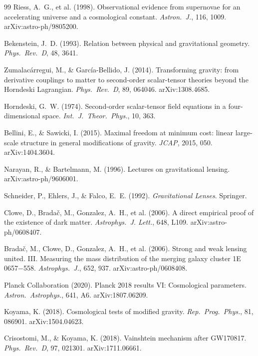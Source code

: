 \documentclass[12pt,a4paper]{article}
\begin{document}
\begin{thebibliography}{99}
  Riess, A.~G., et al. (1998).
  Observational evidence from supernovae for an accelerating universe and a
  cosmological constant.
  \textit{Astron.\ J.}, 116, 1009.
  arXiv:astro-ph/9805200.

  Bekenstein, J.~D. (1993).
  Relation between physical and gravitational geometry.
  \textit{Phys.\ Rev.\ D}, 48, 3641.

  Zumalacárregui, M., \& García-Bellido, J. (2014).
  Transforming gravity: from derivative couplings to matter to second-order
  scalar-tensor theories beyond the Horndeski Lagrangian.
  \textit{Phys.\ Rev.\ D}, 89, 064046.
  arXiv:1308.4685.

  Horndeski, G.~W. (1974).
  Second-order scalar-tensor field equations in a four-dimensional space.
  \textit{Int.\ J.\ Theor.\ Phys.}, 10, 363.

  Bellini, E., \& Sawicki, I. (2015).
  Maximal freedom at minimum cost: linear large-scale structure in general
  modifications of gravity.
  \textit{JCAP}, 2015, 050.
  arXiv:1404.3604.

  Narayan, R., \& Bartelmann, M. (1996).
  Lectures on gravitational lensing.
  arXiv:astro-ph/9606001.

  Schneider, P., Ehlers, J., \& Falco, E.~E. (1992).
  \textit{Gravitational Lenses}.
  Springer.

  Clowe, D., Bradač, M., Gonzalez, A.~H., et al. (2006).
  A direct empirical proof of the existence of dark matter.
  \textit{Astrophys.\ J. Lett.}, 648, L109.
  arXiv:astro-ph/0608407.

  Bradač, M., Clowe, D., Gonzalez, A.~H., et al. (2006).
  Strong and weak lensing united. III. Measuring the mass distribution of
  the merging galaxy cluster 1E 0657$-$558.
  \textit{Astrophys.\ J.}, 652, 937.
  arXiv:astro-ph/0608408.

  Planck Collaboration (2020).
  Planck 2018 results VI: Cosmological parameters.
  \textit{Astron.\ Astrophys.}, 641, A6.
  arXiv:1807.06209.

  Koyama, K. (2018).
  Cosmological tests of modified gravity.
  \textit{Rep.\ Prog.\ Phys.}, 81, 086901.
  arXiv:1504.04623.

  Crisostomi, M., \& Koyama, K. (2018).
  Vainshtein mechanism after GW170817.
  \textit{Phys.\ Rev.\ D}, 97, 021301.
  arXiv:1711.06661.

\end{thebibliography}
\end{document}
